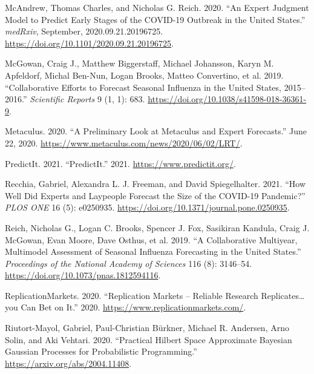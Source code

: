 \documentclass[
]{article}
\newlength{\cslhangindent}
\newlength{\cslentryspacingunit} %
\newenvironment{CSLReferences}[2] %
 {%
  \setlength{\parindent}{0pt}
  \ifodd #1
  \let\oldpar\par
  \def\par{\hangindent=\cslhangindent\oldpar}
  \fi
  \setlength{\parskip}{#2\cslentryspacingunit}
 }%
 {}
\begin{document}
\begin{CSLReferences}{1}{0}
\leavevmode{}%
McAndrew, Thomas Charles, and Nicholas G. Reich. 2020. {``An Expert Judgment Model to Predict Early Stages of the {COVID}-19 Outbreak in the {United States}.''} \emph{medRxiv}, September, 2020.09.21.20196725. \url{https://doi.org/10.1101/2020.09.21.20196725}.

\leavevmode{}%
McGowan, Craig J., Matthew Biggerstaff, Michael Johansson, Karyn M. Apfeldorf, Michal Ben-Nun, Logan Brooks, Matteo Convertino, et al. 2019. {``Collaborative Efforts to Forecast Seasonal Influenza in the {United States}, 2015--2016.''} \emph{Scientific Reports} 9 (1, 1): 683. \url{https://doi.org/10.1038/s41598-018-36361-9}.

\leavevmode{}%
Metaculus. 2020. {``A {Preliminary Look} at {Metaculus} and {Expert Forecasts}.''} June 22, 2020. \url{https://www.metaculus.com/news/2020/06/02/LRT/}.

\leavevmode{}%
PredictIt. 2021. {``{PredictIt}.''} 2021. \url{https://www.predictit.org/}.

\leavevmode{}%
Recchia, Gabriel, Alexandra L. J. Freeman, and David Spiegelhalter. 2021. {``How Well Did Experts and Laypeople Forecast the Size of the {COVID}-19 Pandemic?''} \emph{PLOS ONE} 16 (5): e0250935. \url{https://doi.org/10.1371/journal.pone.0250935}.

\leavevmode{}%
Reich, Nicholas G., Logan C. Brooks, Spencer J. Fox, Sasikiran Kandula, Craig J. McGowan, Evan Moore, Dave Osthus, et al. 2019. {``A Collaborative Multiyear, Multimodel Assessment of Seasonal Influenza Forecasting in the {United States}.''} \emph{Proceedings of the National Academy of Sciences} 116 (8): 3146--54. \url{https://doi.org/10.1073/pnas.1812594116}.

\leavevmode{}%
ReplicationMarkets. 2020. {``Replication {Markets} -- {Reliable} Research Replicates\ldots you Can Bet on It.''} 2020. \url{https://www.replicationmarkets.com/}.

\leavevmode{}%
Riutort-Mayol, Gabriel, Paul-Christian Bürkner, Michael R. Andersen, Arno Solin, and Aki Vehtari. 2020. {``Practical Hilbert Space Approximate Bayesian Gaussian Processes for Probabilistic Programming.''} \url{https://arxiv.org/abs/2004.11408}.


\end{CSLReferences}
\end{document}
